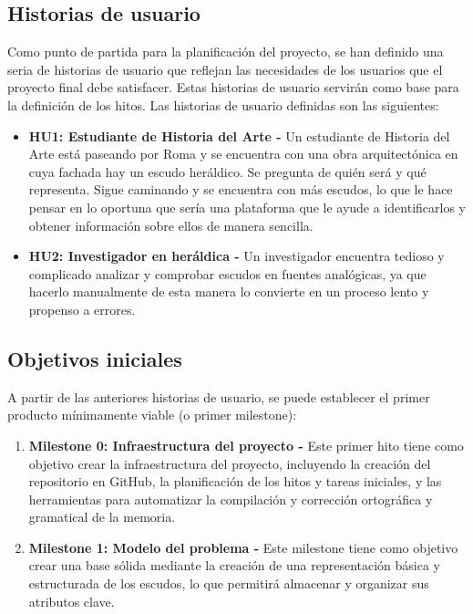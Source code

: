 \subsection{Historias de usuario}
Como punto de partida para la planificación del proyecto, se han definido una seria de 
historias de usuario que reflejan las necesidades de los usuarios que el proyecto final
debe satisfacer. Estas historias de usuario servirán como base para la definición de los hitos.
Las historias de usuario definidas son las siguientes:
\begin{itemize}
    \item \textbf{HU1: Estudiante de Historia del Arte - }Un estudiante de Historia del 
    Arte está paseando por Roma y se encuentra con una obra arquitectónica en cuya fachada
    hay un escudo heráldico. Se pregunta de quién será y qué representa. Sigue caminando 
    y se encuentra con más escudos, lo que le hace pensar en lo oportuna que sería una 
    plataforma que le ayude a identificarlos y obtener información sobre ellos de manera 
    sencilla.
    \item \textbf{HU2: Investigador en heráldica - }Un investigador encuentra tedioso y
    complicado analizar y comprobar escudos en fuentes analógicas, ya que hacerlo manualmente
    de esta manera lo convierte en un proceso lento y propenso a errores.
\end{itemize}

\subsection{Objetivos iniciales}
A partir de las anteriores historias de usuario, se puede establecer el primer
producto mínimamente viable (o primer milestone):
\begin{enumerate}
    \item \textbf{Milestone 0: Infraestructura del proyecto - }Este primer hito tiene como 
    objetivo crear la infraestructura del proyecto, incluyendo la creación del repositorio
    en GitHub, la planificación de los hitos y tareas iniciales, y las herramientas para automatizar
    la compilación y corrección ortográfica y gramatical de la memoria.
    \item \textbf{Milestone 1: Modelo del problema - }Este milestone tiene como objetivo
    crear una base sólida mediante la creación de una representación básica y estructurada
    de los escudos, lo que permitirá almacenar y organizar sus atributos clave.
\end{enumerate}

